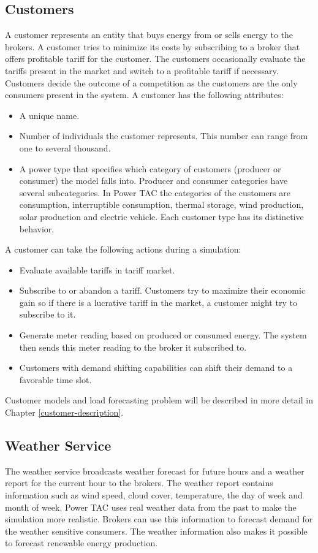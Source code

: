 \subsection{Customers}
A customer represents an entity that buys energy from or sells energy to the brokers. A customer tries to minimize its costs by subscribing to a broker that offers profitable tariff for the customer. The customers occasionally evaluate the tariffs present in the market and switch to a profitable tariff if necessary. Customers decide the outcome of a competition as the customers are the only consumers present in the system. A customer has the following attributes:
\begin{itemize}  
\item A unique name. 
\item Number of individuals the customer represents. This number can range from one to several thousand. 
\item A power type that specifies which category of customers (producer or consumer) the model falls into. Producer and consumer categories have several subcategories. In Power TAC the categories of the customers are consumption, interruptible consumption, thermal storage, wind production, solar production and electric vehicle. Each customer type has its distinctive behavior. 
\end{itemize}

A customer can take the following actions during a simulation:
\begin{itemize}  
\item Evaluate available tariffs in tariff market.
\item Subscribe to or abandon a tariff. Customers try to maximize their economic gain so if there is a lucrative tariff in the market, a customer might try to subscribe to it.
\item Generate meter reading based on produced or consumed energy. The system then sends this meter reading to the broker it subscribed to. 
\item Customers with demand shifting capabilities can shift their demand to a favorable time slot.
\end{itemize}
 
Customer models and load forecasting problem will be described in more detail in Chapter \ref{customer-description}.

\subsection{Weather Service}
The weather service broadcasts weather forecast for future hours and a weather report for the current hour to the brokers. The weather report contains information such as wind speed, cloud cover, temperature, the day of week and month of week. Power TAC uses real weather data from the past to make the simulation more realistic. Brokers can use this information to forecast demand for the weather sensitive consumers. The weather information also makes it possible to forecast renewable energy production.



